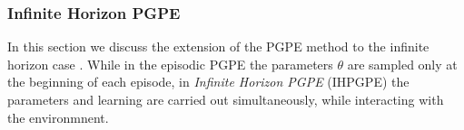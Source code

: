 \subsubsection{Infinite Horizon PGPE}
In this section we discuss the extension of the PGPE method to the infinite
horizon case \cite{sehnke2012parameter}. While in the episodic PGPE the
parameters $\theta$ are sampled only at the beginning of each episode, in
\emph{Infinite Horizon PGPE} (IHPGPE) the parameters and learning are carried 
out simultaneously, while interacting with the environmnent.




